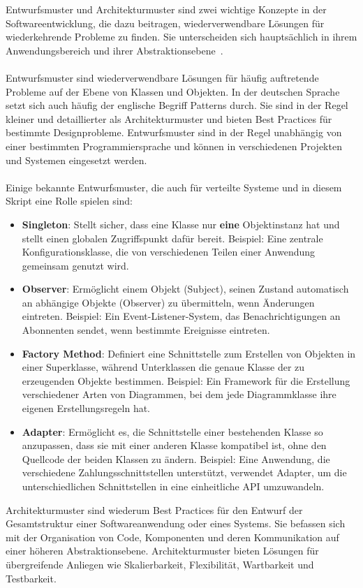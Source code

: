 \documentclass[../vs-script-first-v01.tex]{subfiles}
\begin{document}
Entwurfsmuster und Architekturmuster sind zwei wichtige Konzepte in der Softwareentwicklung, die dazu beitragen, wiederverwendbare Lösungen für wiederkehrende Probleme zu finden. Sie unterscheiden sich hauptsächlich in ihrem Anwendungsbereich und ihrer Abstraktionsebene~\cite{gamma1994design}.
\\\\
Entwurfsmuster sind wiederverwendbare Lösungen für häufig auftretende Probleme auf der Ebene von Klassen und Objekten. In der deutschen Sprache setzt sich auch häufig der englische Begriff Patterns durch. Sie sind in der Regel kleiner und detaillierter als Architekturmuster und bieten Best Practices für bestimmte Designprobleme. Entwurfsmuster sind in der Regel unabhängig von einer bestimmten Programmiersprache und können in verschiedenen Projekten und Systemen eingesetzt werden.
\\\\
Einige bekannte Entwurfsmuster, die auch für verteilte Systeme und in diesem Skript eine Rolle spielen sind:
\begin{itemize}
\item \textbf{Singleton}: Stellt sicher, dass eine Klasse nur \textbf{eine} Objektinstanz hat und stellt einen globalen Zugriffspunkt dafür bereit. Beispiel: Eine zentrale Konfigurationsklasse, die von verschiedenen Teilen einer Anwendung gemeinsam genutzt wird.
\item \textbf{Observer}: Ermöglicht einem Objekt (Subject), seinen Zustand automatisch an abhängige Objekte (Observer) zu übermitteln, wenn Änderungen eintreten. Beispiel: Ein Event-Listener-System, das Benachrichtigungen an Abonnenten sendet, wenn bestimmte Ereignisse eintreten.
\item \textbf{Factory Method}: Definiert eine Schnittstelle zum Erstellen von Objekten in einer Superklasse, während Unterklassen die genaue Klasse der zu erzeugenden Objekte bestimmen. Beispiel: Ein Framework für die Erstellung verschiedener Arten von Diagrammen, bei dem jede Diagrammklasse ihre eigenen Erstellungsregeln hat.
\item \textbf{Adapter}: Ermöglicht es, die Schnittstelle einer bestehenden Klasse so anzupassen, dass sie mit einer anderen Klasse kompatibel ist, ohne den Quellcode der beiden Klassen zu ändern. Beispiel: Eine Anwendung, die verschiedene Zahlungsschnittstellen unterstützt, verwendet Adapter, um die unterschiedlichen Schnittstellen in eine einheitliche API umzuwandeln.
\end{itemize}
Architekturmuster sind wiederum Best Practices für den Entwurf der Gesamtstruktur einer Softwareanwendung oder eines Systems. Sie befassen sich mit der Organisation von Code, Komponenten und deren Kommunikation auf einer höheren Abstraktionsebene. Architekturmuster bieten Lösungen für übergreifende Anliegen wie Skalierbarkeit, Flexibilität, Wartbarkeit und Testbarkeit.
\end{document}
